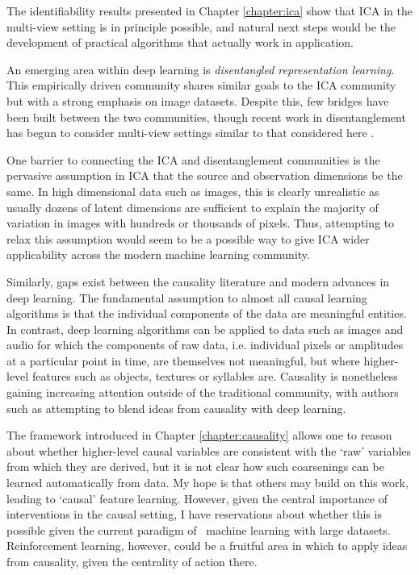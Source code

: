 The identifiability results presented in Chapter \ref{chapter:ica} show that ICA in the multi-view setting is in principle possible, and natural next steps would be the development of practical algorithms that actually work in application.

An emerging area within deep learning is \emph{disentangled representation learning}. 
This empirically driven community shares similar goals to the ICA community but with a strong emphasis on image datasets.
Despite this, few bridges have been built between the two communities, though recent work in  disentanglement has begun to consider multi-view settings similar to that considered here \citep{shu2019weakly}.

One barrier to connecting the ICA and disentanglement communities is the pervasive assumption in ICA that the source and observation dimensions be the same.
In high dimensional data such as images, this is clearly unrealistic as usually dozens of latent dimensions are sufficient to explain the majority of variation in images with hundreds or thousands of pixels. 
Thus, attempting to relax this assumption would seem to be a possible way to give ICA wider applicability across the modern machine learning community.


Similarly, gaps exist between the causality literature and modern advances in deep learning.
The fundamental assumption to almost all causal learning algorithms is that the individual components of the data are meaningful entities. 
In contrast, deep learning algorithms can be applied to data such as images and audio for which the components of raw data, i.e. individual pixels or amplitudes at a particular point in time, are themselves not meaningful, but where higher-level features such as objects, textures or syllables are.
Causality is nonetheless gaining increasing attention outside of the traditional community, with authors such as \cite{bengio2019meta} attempting to blend ideas from causality with deep learning.

The framework introduced in Chapter \ref{chapter:causality} allows one to reason about whether higher-level causal variables are consistent with the `raw' variables from which they are derived, but it is not clear how such coarsenings can be learned automatically from data.
My hope is that others may build on this work, leading to `causal' feature learning.
However, given the central importance of interventions in the causal setting, I have reservations about whether this is possible given the current paradigm of \iid~machine learning with large datasets.
Reinforcement learning, however, could be a fruitful area in which to apply ideas from causality, given the centrality of action there.




